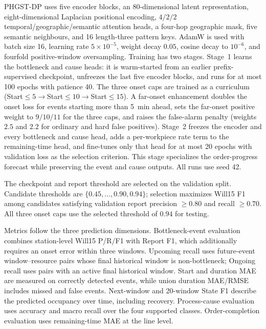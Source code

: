 \documentclass[a4paper,fleqn]{cas-dc}
\begin{document}
PHGST-DP uses five encoder blocks, an 80-dimensional latent representation, eight-dimensional Laplacian positional encoding, $4/2/2$ temporal/geographic/semantic attention heads, a four-hop geographic mask, five semantic neighbours, and 16 length-three pattern keys. AdamW is used with batch size 16, learning rate $5\times10^{-5}$, weight decay $0.05$, cosine decay to $10^{-6}$, and fourfold positive-window oversampling. Training has two stages. Stage~1 learns the bottleneck and cause heads: it is warm-started from an earlier prefix-supervised checkpoint, unfreezes the last five encoder blocks, and runs for at most 100 epochs with patience 40. The three onset caps are trained as a curriculum (Start$\leq5\rightarrow$Start$\leq10\rightarrow$Start$\leq15$). A far-onset enhancement doubles the onset loss for events starting more than 5~min ahead, sets the far-onset positive weight to $9/10/11$ for the three caps, and raises the false-alarm penalty (weights $2.5$ and $2.2$ for ordinary and hard false positives). Stage~2 freezes the encoder and every bottleneck and cause head, adds a per-workpiece rate term to the remaining-time head, and fine-tunes only that head for at most 20 epochs with validation loss as the selection criterion. This stage specializes the order-progress forecast while preserving the event and cause outputs. All runs use seed 42.


The checkpoint and report threshold are selected on the validation split. Candidate thresholds are $\{0.45,\dots,0.90,0.94\}$; selection maximizes Will15 F1 among candidates satisfying validation report precision $\geq0.80$ and recall $\geq0.70$. All three onset caps use the selected threshold of $0.94$ for testing.


Metrics follow the three prediction dimensions. Bottleneck-event evaluation combines station-level Will15 P/R/F1 with Report F1, which additionally requires an onset error within three windows. Upcoming recall uses future-event window--resource pairs whose final historical window is non-bottleneck; Ongoing recall uses pairs with an active final historical window. Start and duration MAE are measured on correctly detected events, while union duration MAE/RMSE includes missed and false events. Next-window and 20-window State F1 describe the predicted occupancy over time, including recovery. Process-cause evaluation uses accuracy and macro recall over the four supported classes. Order-completion evaluation uses remaining-time MAE at the line level.
\end{document}
